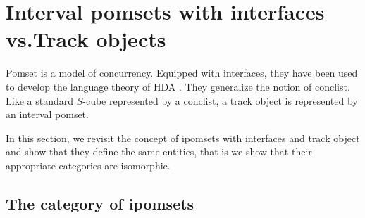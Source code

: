 \documentclass[11pt,a4paper,oldfontcommands]{memoir}
\newcommand{\Dom}[1] {\mathcal{D}_{#1}}
\newcommand*\exec{%
  \raisebox{1pt}{%
    \begin{tikzpicture}[x=.8ex,y=1ex,-]
      \draw (0,0) -- (1,0) -- (1,1) -- (2,1);
    \end{tikzpicture}}}
\begin{document}
\section{Interval pomsets with interfaces vs.Track objects}
Pomset is a model of concurrency. Equipped with interfaces, they have been used to develop the language theory of HDA \cite{MyhillNerode,amrane2023developments,LanguageofHDA,KleeneTh}. They generalize the notion of conclist. Like a standard $S$-cube represented by a conclist, a track object is represented by an interval pomset. 

In this section, we revisit the concept of ipomsets with interfaces and track object and show that they define the same entities, that is we show that their appropriate categories are isomorphic.


\subsection{The category of ipomsets}\label{subsec: ipomset}
\end{document}
